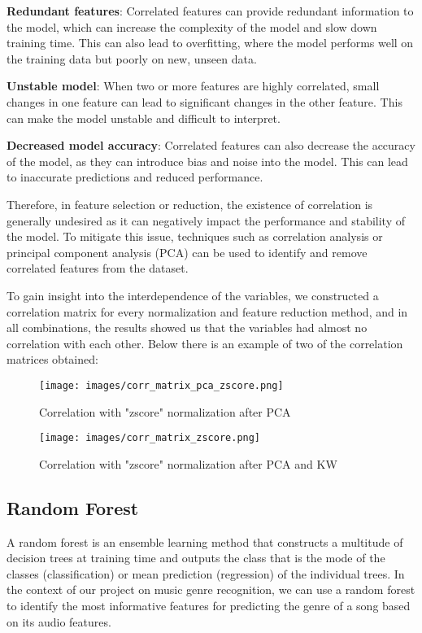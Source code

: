 \documentclass[12pt, a4paper]{article}
\begin{document}
\textbf{Redundant features}: Correlated features can provide redundant information to the model, which can increase the complexity of the model and slow down training time. This can also lead to overfitting, where the model performs well on the training data but poorly on new, unseen data.

\textbf{Unstable model}: When two or more features are highly correlated, small changes in one feature can lead to significant changes in the other feature. This can make the model unstable and difficult to interpret.

\textbf{Decreased model accuracy}: Correlated features can also decrease the accuracy of the model, as they can introduce bias and noise into the model. This can lead to inaccurate predictions and reduced performance.

Therefore, in feature selection or reduction, the existence of correlation is generally undesired as it can negatively impact the performance and stability of the model. To mitigate this issue, techniques such as correlation analysis or principal component analysis (PCA) can be used to identify and remove correlated features from the dataset.

To gain insight into the interdependence of the variables, we constructed a correlation matrix for every normalization and feature reduction method, and in all combinations, the results showed us that the variables had almost no correlation with each other. Below there is an example of two of the correlation matrices obtained:

\begin{figure}[H]
\centering
\texttt{[image: images/corr\_matrix\_pca\_zscore.png]}
\caption{Correlation with "zscore" normalization after PCA }
\label{fig:myimage}
\end{figure}

\begin{figure}[H]
\centering
\texttt{[image: images/corr\_matrix\_zscore.png]}
\caption{Correlation with "zscore" normalization after PCA and KW }
\label{fig:myimage}
\end{figure}

\subsection{Random Forest}

A random forest is an ensemble learning method that constructs a multitude of decision trees at training time and outputs the class that is the mode of the classes (classification) or mean prediction (regression) of the individual trees. In the context of our project on music genre recognition, we can use a random forest to identify the most informative features for predicting the genre of a song based on its audio features.
\end{document}

